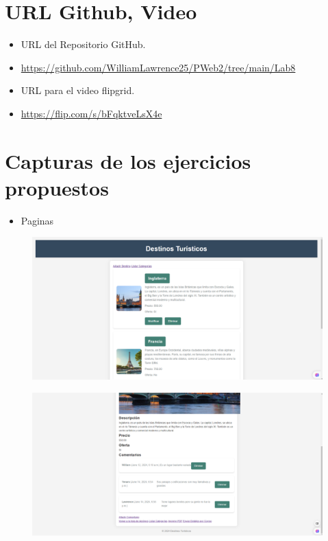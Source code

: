 \documentclass{article}
\begin{document}
	\section{URL Github, Video}
	\begin{itemize}
		\item URL del Repositorio GitHub.
		\item \url{https://github.com/WilliamLawrence25/PWeb2/tree/main/Lab8}
		\item URL para el video flipgrid.
		\item \url{https://flip.com/s/bFqktveLsX4e}	
	
	\end{itemize}
	\clearpage	
	
	\section{Capturas de los ejercicios propuestos}
	
	\begin{itemize}
		\item Paginas
	\end{itemize}
	\begin{figure}[H]
		\centering
		\includegraphics[width=1.0\textwidth, keepaspectratio]{img/pagina1}
	\end{figure}
	
	\begin{figure}[H]
		\centering
		\includegraphics[width=1.0\textwidth, keepaspectratio]{img/pagina2}
	\end{figure}
	
\end{document}
